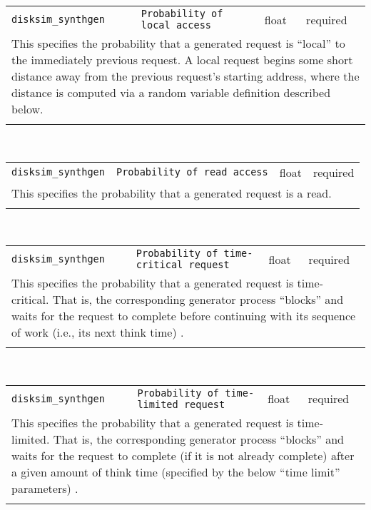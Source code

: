 \noindent 
\begin{tabular}{|p{1.5in}|p{3.5in}|p{0.5in}|p{0.5in}|}
\cline{1-4}
\texttt{disksim\_synthgen} & \texttt{Probability of local access} & float & required \\ 
\cline{1-4}
\multicolumn{4}{|p{6in}|}{
This specifies the probability that a generated request is ``local'' to
the immediately previous request. A local request begins some short
distance away from the previous request's starting address, where the
distance is computed via a random variable definition described below.
}\\ 
\cline{1-4}
\multicolumn{4}{p{5in}}{}\\
\end{tabular}\\ 
\noindent 
\begin{tabular}{|p{1.5in}|p{3.5in}|p{0.5in}|p{0.5in}|}
\cline{1-4}
\texttt{disksim\_synthgen} & \texttt{Probability of read access} & float & required \\ 
\cline{1-4}
\multicolumn{4}{|p{6in}|}{
This specifies the probability that a generated request is a read.
}\\ 
\cline{1-4}
\multicolumn{4}{p{5in}}{}\\
\end{tabular}\\ 
\noindent 
\begin{tabular}{|p{1.5in}|p{3.5in}|p{0.5in}|p{0.5in}|}
\cline{1-4}
\texttt{disksim\_synthgen} & \texttt{Probability of time-critical request} & float & required \\ 
\cline{1-4}
\multicolumn{4}{|p{6in}|}{
This specifies the probability that a generated request is time-critical.
That is, the corresponding generator process ``blocks'' and waits for
the request to complete before continuing with its sequence of work
(i.e., its next think time) \cite{Ganger93,Ganger95}.
}\\ 
\cline{1-4}
\multicolumn{4}{p{5in}}{}\\
\end{tabular}\\ 
\noindent 
\begin{tabular}{|p{1.5in}|p{3.5in}|p{0.5in}|p{0.5in}|}
\cline{1-4}
\texttt{disksim\_synthgen} & \texttt{Probability of time-limited request} & float & required \\ 
\cline{1-4}
\multicolumn{4}{|p{6in}|}{
This specifies the probability that a generated request is
time-limited. That is, the corresponding generator process ``blocks''
and waits for the request to complete (if it is not already complete)
after a given amount of think time (specified by the below ``time
limit'' parameters) \cite{Ganger93,Ganger95}.
}\\ 
\cline{1-4}
\multicolumn{4}{p{5in}}{}\\
\end{tabular}\\ 
